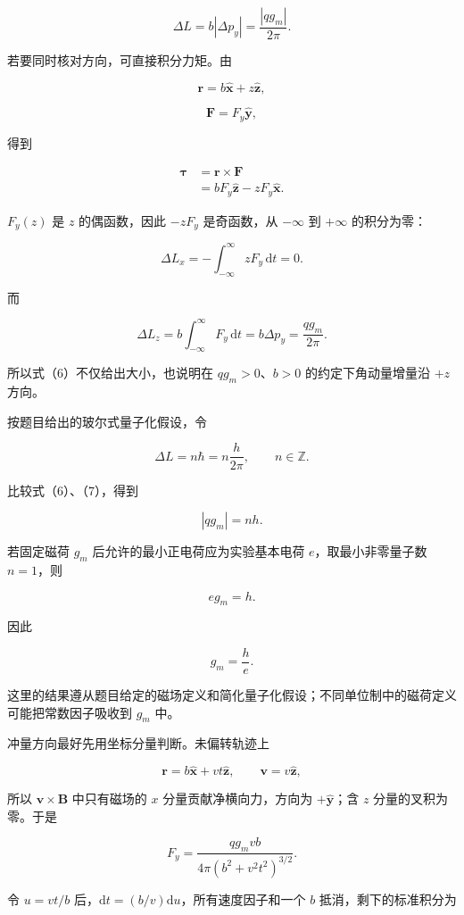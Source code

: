 \documentclass[12pt,a4paper,UTF8]{ctexart}
\begin{document}
\[\Delta L=b|\Delta p_y|
=\frac{|qg_m|}{2\pi}. \tag{6}\]

若要同时核对方向，可直接积分力矩。由

\[\boldsymbol r=b\hat{\boldsymbol x}+z\hat{\boldsymbol z},\]

\[\boldsymbol F=F_y\hat{\boldsymbol y},\]

得到

\[\begin{aligned}
\boldsymbol\tau
&=\boldsymbol r\times\boldsymbol F\\
&=bF_y\hat{\boldsymbol z}-zF_y\hat{\boldsymbol x}.
\end{aligned}\]

\(F_y(z)\) 是 \(z\) 的偶函数，因此 \(-zF_y\) 是奇函数，从 \(-\infty\) 到
\(+\infty\) 的积分为零：

\[\Delta L_x=-\int_{-\infty}^{\infty}zF_y\,\mathrm dt=0.\]

而

\[\Delta L_z=b\int_{-\infty}^{\infty}F_y\,\mathrm dt
=b\Delta p_y
=\frac{qg_m}{2\pi}.\]

所以式（6）不仅给出大小，也说明在 \(qg_m>0\)、\(b>0\)
的约定下角动量增量沿 \(+z\) 方向。

按题目给出的玻尔式量子化假设，令

\[\Delta L=n\hbar=n\frac{h}{2\pi},\qquad n\in\mathbb Z. \tag{7}\]

比较式（6）、（7），得到

\[|qg_m|=nh. \tag{8}\]

若固定磁荷 \(g_m\) 后允许的最小正电荷应为实验基本电荷
\(e\)，取最小非零量子数 \(n=1\)，则

\[eg_m=h.\]

因此

\[\boxed{g_m=\frac{h}{e}}. \tag{9}\]

这里的结果遵从题目给定的磁场定义和简化量子化假设；不同单位制中的磁荷定义可能把常数因子吸收到
\(g_m\) 中。

冲量方向最好先用坐标分量判断。未偏转轨迹上

\[\boldsymbol r=b\hat{\boldsymbol x}+vt\hat{\boldsymbol z},\qquad
\boldsymbol v=v\hat{\boldsymbol z},\]

所以 \(\boldsymbol v\times\boldsymbol B\) 中只有磁场的 \(x\)
分量贡献净横向力，方向为 \(+\hat{\boldsymbol y}\)；含 \(z\)
分量的叉积为零。于是

\[F_y=\frac{qg_mvb}{4\pi(b^2+v^2t^2)^{3/2}}.\]

令 \(u=vt/b\) 后，\(\mathrm dt=(b/v)\mathrm du\)，所有速度因子和一个
\(b\) 抵消，剩下的标准积分为
\end{document}

